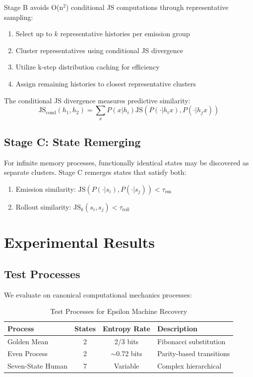 \documentclass[12pt]{article}
\begin{document}
Stage B avoids O(n$^2$) conditional JS computations through representative sampling:

\begin{enumerate}
    \item Select up to $k$ representative histories per emission group
    \item Cluster representatives using conditional JS divergence
    \item Utilize k-step distribution caching for efficiency
    \item Assign remaining histories to closest representative clusters
\end{enumerate}

The conditional JS divergence measures predictive similarity:
$$\text{JS}_{\text{cond}}(h_1, h_2) = \sum_{x} P(x|h_i) \text{JS}(P(\cdot|h_i x), P(\cdot|h_j x))$$

\subsection{Stage C: State Remerging}

For infinite memory processes, functionally identical states may be discovered as separate clusters. Stage C remerges states that satisfy both:
\begin{enumerate}
    \item Emission similarity: $\text{JS}(P(\cdot|s_i), P(\cdot|s_j)) < \tau_{\text{em}}$
    \item Rollout similarity: $\text{JS}_k(s_i, s_j) < \tau_{\text{roll}}$
\end{enumerate}

\section{Experimental Results}

\subsection{Test Processes}

We evaluate on canonical computational mechanics processes:

\begin{table}[h]
\centering
\begin{tabular}{@{}lccl@{}}
\toprule
Process & States & Entropy Rate & Description \\
\midrule
Golden Mean & 2 & 2/3 bits & Fibonacci substitution \\
Even Process & 2 & $\sim$0.72 bits & Parity-based transitions \\
Seven-State Human & 7 & Variable & Complex hierarchical \\
\bottomrule
\end{tabular}
\caption{Test Processes for Epsilon Machine Recovery}
\end{table}
\end{document}
